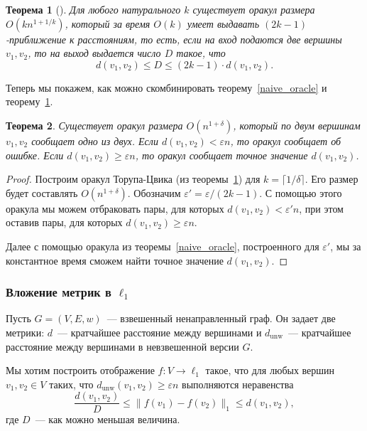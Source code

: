\documentclass[12pt]{article}
\newcommand{\eps}{\varepsilon}
\newcommand{\dunw}{d_{\mathrm{unw}}}
\newtheorem{theorem}{Теорема}
\begin{document}
    \begin{theorem}[\cite{TZ05}]
        \label{thorup_zwick}
        Для любого натурального $k$ существует оракул размера $O(kn^{1 + 1/k})$, который за время $O(k)$
        умеет выдавать $(2k - 1)$-приближение к расстояниям, то есть, если на вход подаются две вершины $v_1, v_2$,
        то на выход выдается число $D$ такое, что
        $$
            d(v_1, v_2) \leq D \leq (2k - 1) \cdot d(v_1, v_2).
        $$
    \end{theorem}

    Теперь мы покажем, как можно скомбинировать теорему~\ref{naive_oracle} и теорему~\ref{thorup_zwick}.

    \begin{theorem}
        Существует оракул размера $O(n^{1 + \delta})$, который по двум вершинам $v_1, v_2$ сообщает одно из двух.
        Если $d(v_1, v_2) < \eps n$, то оракул сообщает об ошибке. Если $d(v_1, v_2) \geq \eps n$,
        то оракул сообщает точное значение $d(v_1, v_2)$.
    \end{theorem}
    \begin{proof}
        Построим оракул Торупа-Цвика (из теоремы~\ref{thorup_zwick}) для $k = \lceil 1 / \delta \rceil$.
        Его размер будет составлять $O(n^{1 + \delta})$. Обозначим $\eps' = \eps / (2k - 1)$.
        С помощью этого оракула мы можем отбраковать пары, для которых $d(v_1, v_2) < \eps' n$, при этом
        оставив пары, для которых $d(v_1, v_2) \geq \eps n$.

        Далее с помощью оракула из теоремы~\ref{naive_oracle}, построенного для $\eps'$, мы за константное время
        сможем найти точное значение $d(v_1, v_2)$.
    \end{proof}
    \subsubsection{Вложение метрик в $\ell_1$}
    \label{subsubsection_metric_embeddings}
    Пусть $G = (V, E, w)$~--- взвешенный ненаправленный граф. Он задает две метрики: $d$~--- кратчайшее расстояние
    между вершинами и $\dunw$~--- кратчайшее расстояние между вершинами в невзвешенной версии $G$.

    Мы хотим построить отображение $f \colon V \to \ell_1$ такое, что для любых вершин $v_1, v_2 \in V$ таких,
    что $\dunw(v_1, v_2) \geq \eps n$ выполняются неравенства
    $$
        \frac{d(v_1, v_2)}{D} \leq \|f(v_1) - f(v_2)\|_1 \leq d(v_1, v_2),
    $$
    где $D$~--- как можно меньшая величина.
\end{document}
